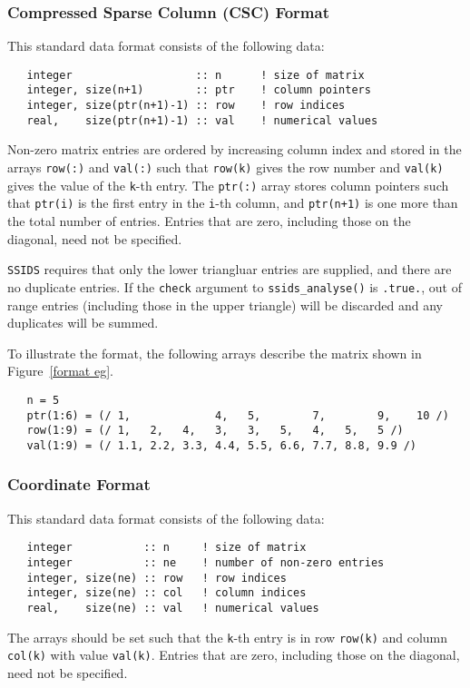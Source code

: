\documentclass{spral}
\begin{document}
\subsubsection{Compressed Sparse Column (CSC) Format} \label{cscformat}
This standard data format consists of the following data:
\begin{verbatim}
   integer                   :: n      ! size of matrix
   integer, size(n+1)        :: ptr    ! column pointers
   integer, size(ptr(n+1)-1) :: row    ! row indices
   real,    size(ptr(n+1)-1) :: val    ! numerical values
\end{verbatim}
Non-zero matrix entries are ordered by increasing column index and stored in
the arrays \texttt{row(:)} and \texttt{val(:)} such that \texttt{row(k)} gives
the row number and \texttt{val(k)} gives the value of the \texttt{k}-th entry.
The \texttt{ptr(:)} array stores column pointers such that \texttt{ptr(i)} is
the first entry in the \texttt{i}-th column, and \texttt{ptr(n+1)} is one more
than the total number of entries.
Entries that are zero, including those on the diagonal, need not be specified.

\texttt{SSIDS} requires that only the lower triangluar entries are supplied,
and there are no duplicate entries. If the \texttt{check} argument to
\texttt{ssids\_analyse()} is \texttt{.true.}, out of range entries (including
those in the upper triangle) will be discarded and any duplicates will be
summed.

To illustrate the format, the following arrays describe the matrix shown in
Figure~\ref{format eg}.
\begin{verbatim}
   n = 5
   ptr(1:6) = (/ 1,             4,   5,        7,        9,    10 /)
   row(1:9) = (/ 1,   2,   4,   3,   3,   5,   4,   5,   5 /)
   val(1:9) = (/ 1.1, 2.2, 3.3, 4.4, 5.5, 6.6, 7.7, 8.8, 9.9 /)
\end{verbatim}

\subsubsection{Coordinate Format} \label{coordformat}
This standard data format consists of the following data:
\begin{verbatim}
   integer           :: n     ! size of matrix
   integer           :: ne    ! number of non-zero entries
   integer, size(ne) :: row   ! row indices
   integer, size(ne) :: col   ! column indices
   real,    size(ne) :: val   ! numerical values
\end{verbatim}
The arrays should be set such that the \texttt{k}-th entry is in row
\texttt{row(k)} and column \texttt{col(k)} with value \texttt{val(k)}.
Entries that are zero, including those on the diagonal, need not be specified.
\end{document}
